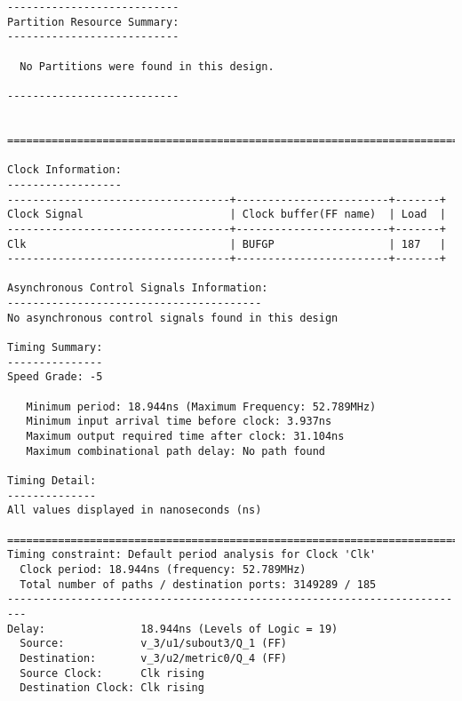 \documentclass[14pt]{report}
\begin{document}
{\begin{verbatim}
---------------------------
Partition Resource Summary:
---------------------------

  No Partitions were found in this design.

---------------------------


=========================================================================

Clock Information:
------------------
-----------------------------------+------------------------+-------+
Clock Signal                       | Clock buffer(FF name)  | Load  |
-----------------------------------+------------------------+-------+
Clk                                | BUFGP                  | 187   |
-----------------------------------+------------------------+-------+

Asynchronous Control Signals Information:
----------------------------------------
No asynchronous control signals found in this design

Timing Summary:
---------------
Speed Grade: -5

   Minimum period: 18.944ns (Maximum Frequency: 52.789MHz)
   Minimum input arrival time before clock: 3.937ns
   Maximum output required time after clock: 31.104ns
   Maximum combinational path delay: No path found

Timing Detail:
--------------
All values displayed in nanoseconds (ns)

=========================================================================
Timing constraint: Default period analysis for Clock 'Clk'
  Clock period: 18.944ns (frequency: 52.789MHz)
  Total number of paths / destination ports: 3149289 / 185
-------------------------------------------------------------------------
Delay:               18.944ns (Levels of Logic = 19)
  Source:            v_3/u1/subout3/Q_1 (FF)
  Destination:       v_3/u2/metric0/Q_4 (FF)
  Source Clock:      Clk rising
  Destination Clock: Clk rising


\end{verbatim}}
\end{document}
